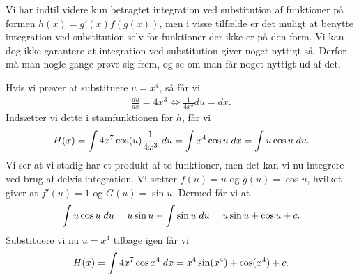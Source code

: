 \begin{enumerate}
Vi har indtil videre kun betragtet integration ved substitution af funktioner på formen $h(x)=g'(x)f(g(x))$, men i visse tilfælde er det muligt at benytte integration ved substitution selv for funktioner der ikke er på den form. Vi kan dog ikke garantere at integration ved substitution giver noget nyttigt så. Derfor må man nogle gange prøve sig frem, og se om man får noget nyttigt ud af det.

Hvis vi prøver at substituere $u=x^4$, så får vi
\begin{align*}
\frac{du}{dx} = 4x^3 \Leftrightarrow \frac{1}{4x^3}du = dx.
\end{align*} 
Indsætter vi dette i stamfunktionen for $h$, får vi
\begin{align*}
H(x)=\int 4x^7 \cos (u) \frac{1}{4x^3}\; d u = \int x^4 \cos u \; d x = \int u \cos u \; d u.
\end{align*}
Vi ser at vi stadig har et produkt af to funktioner, men det kan vi nu integrere ved brug af delvis integration. Vi sætter $f(u)=u$ og $g(u)=\cos u$, hvilket giver at $f'(u)=1$ og $G(u)=\sin u$. Dermed får vi at
\begin{align*}
\int u \cos u \; d u = u\sin u - \int \sin u \; d u = u\sin u + \cos u + c.
\end{align*}
Substituere vi nu $u=x^4$ tilbage igen får vi
\begin{align*}
H(x) = \int 4x^7\cos x^4 \; d x = x^4 \sin (x^4) + \cos (x^4) + c.
\end{align*}
\end{enumerate}



